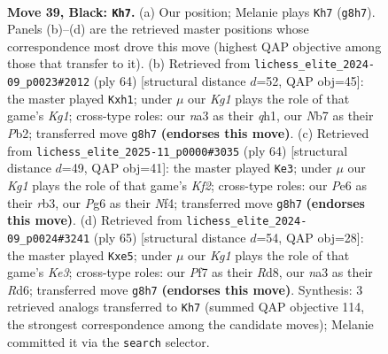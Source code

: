 \documentclass[11pt]{article}
\begin{document}
\clearpage

\begin{figure}[p]\centering
\begin{subfigure}{0.46\textwidth}\centering
\resizebox{\linewidth}{!}{%
\newchessgame
\chessboard[
  setfen={1rr3k1/pn3p2/1p2p1pp/7P/2P5/N1B1P3/PR2KPP1/7R b - - 0 39},
  showmover=false,
  pgfstyle=straightmove, color=movearrow, markmove={g8-h7}
]}
\caption{}
\end{subfigure}\hfill
\begin{subfigure}{0.46\textwidth}\centering
\resizebox{\linewidth}{!}{%
\newchessgame
\chessboard[
  setfen={3rr1k1/2p2pp1/N6p/1p2p3/7n/2PP2P1/PP3P2/3RR1Kq w - - 0 33},
  showmover=false,
  pgfstyle=straightmove, color=movearrow, markmove={g1-h1}
]}
\caption{}
\end{subfigure}
\\[4pt]
\begin{subfigure}{0.46\textwidth}\centering
\resizebox{\linewidth}{!}{%
\newchessgame
\chessboard[
  setfen={6k1/p2n1ppb/B7/2r4p/4PN1P/1rp2PP1/2R2K2/2R5 w - - 9 33},
  showmover=false,
  pgfstyle=straightmove, color=movearrow, markmove={f2-e3}
]}
\caption{}
\end{subfigure}\hfill
\begin{subfigure}{0.46\textwidth}\centering
\resizebox{\linewidth}{!}{%
\newchessgame
\chessboard[
  setfen={3r4/8/1p1rk2p/p1p1N1p1/3pP1PP/1P4K1/P2R1P2/3R4 b - - 0 33},
  showmover=false,
  pgfstyle=straightmove, color=movearrow, markmove={e6-e5}
]}
\caption{}
\end{subfigure}
\caption{\textbf{Move 39, Black: \texttt{Kh7}.} (a) Our position; Melanie plays \texttt{Kh7} (\texttt{g8h7}). Panels (b)--(d) are the retrieved master positions whose correspondence most drove this move (highest QAP objective among those that transfer to it). (b) Retrieved from \texttt{lichess\_elite\_2024-09\_p0023\#2012} (ply 64) [structural distance $d$=52, QAP obj=45]: the master played \texttt{Kxh1}; under $\mu$ our \emph{Kg1} plays the role of that game's \emph{Kg1}; cross-type roles: our \emph{n}a3 as their \emph{q}h1, our \emph{N}b7 as their \emph{P}b2; transferred move \texttt{g8h7} \textbf{(endorses this move)}. (c) Retrieved from \texttt{lichess\_elite\_2025-11\_p0000\#3035} (ply 64) [structural distance $d$=49, QAP obj=41]: the master played \texttt{Ke3}; under $\mu$ our \emph{Kg1} plays the role of that game's \emph{Kf2}; cross-type roles: our \emph{P}e6 as their \emph{r}b3, our \emph{P}g6 as their \emph{N}f4; transferred move \texttt{g8h7} \textbf{(endorses this move)}. (d) Retrieved from \texttt{lichess\_elite\_2024-09\_p0024\#3241} (ply 65) [structural distance $d$=54, QAP obj=28]: the master played \texttt{Kxe5}; under $\mu$ our \emph{Kg1} plays the role of that game's \emph{Ke3}; cross-type roles: our \emph{P}f7 as their \emph{R}d8, our \emph{n}a3 as their \emph{R}d6; transferred move \texttt{g8h7} \textbf{(endorses this move)}. Synthesis: 3 retrieved analogs transferred to \texttt{Kh7} (summed QAP objective 114, the strongest correspondence among the candidate moves); Melanie committed it via the \texttt{search} selector.}
\label{fig:thought-m77}
\end{figure}
\end{document}
